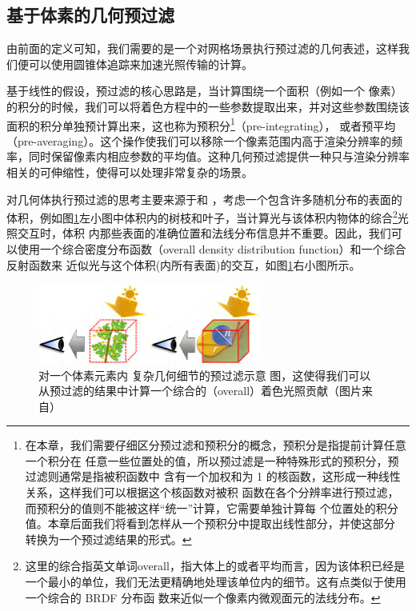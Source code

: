 \subsection{基于体素的几何预过滤}
由前面的定义可知，我们需要的是一个对网格场景执行预过滤的几何表述，这样我们便可以使用圆锥体追踪来加速光照传输的计算。

基于线性的假设，预过滤的核心思路是，当计算围绕一个面积（例如一个 像素）的积分的时候，我们可以将着色方程中的一些参数提取出来，并对这些参数围绕该面积的积分单独预计算出来，这也称为预积分\footnote{在本章，我们需要仔细区分预过滤和预积分的概念，预积分是指提前计算任意一个积分在 任意一些位置处的值，所以预过滤是一种特殊形式的预积分，预过滤则通常是指被积函数中 含有一个加权和为 1 的核函数，这形成一种线性关系，这样我们可以根据这个核函数对被积 函数在各个分辨率进行预过滤，而预积分的值则不能被这样“统一”计算，它需要单独计算每 个位置处的积分值。本章后面我们将看到怎样从一个预积分中提取出线性部分，并使这部分 转换为一个预过滤结果的形式。}（pre-integrating）， 或者预平均（pre-averaging）。这个操作使我们可以移除一个像素范围内高于渲染分辨率的频率，同时保留像素内相应参数的平均值。这种几何预过滤提供一种只与渲染分辨率相关的可伸缩性，使得可以处理非常复杂的场景。

对几何体执行预过滤的思考主要来源于\cite{a:hypetrtexture}和\cite{a:Renderingfurwiththreedimensionaltextures} ，考虑一个包含许多随机分布的表面的体积，例如图\ref{f:vct-4-1}左小图中体积内的树枝和叶子，当计算光与该体积内物体的综合\footnote{这里的综合指英文单词overall，指大体上的或者平均而言，因为该体积已经是一个最小的单位，我们无法更精确地处理该单位内的细节。这有点类似于使用一个综合的 BRDF 分布函 数来近似一个像素内微观面元的法线分布。}光照交互时，体积 内那些表面的准确位置和法线分布信息并不重要。因此，我们可以使用一个综合密度分布函数（overall density distribution function）和一个综合反射函数来 近似光与这个体积(内所有表面)的交互，如图\ref{f:vct-4-1}右小图所示。

\begin{figure}
\sidecaption
	\includegraphics[width=0.65\textwidth]{figures/vct/vct-4-1}
	\caption{对一个体素元素内 复杂几何细节的预过滤示意 图，这使得我们可以从预过滤的结果中计算一个综合的（overall）着色光照贡献（图片来自\cite{a:InteractiveIndirectIlluminationUsingVoxelConeTracing}）}
	\label{f:vct-4-1}
\end{figure}


